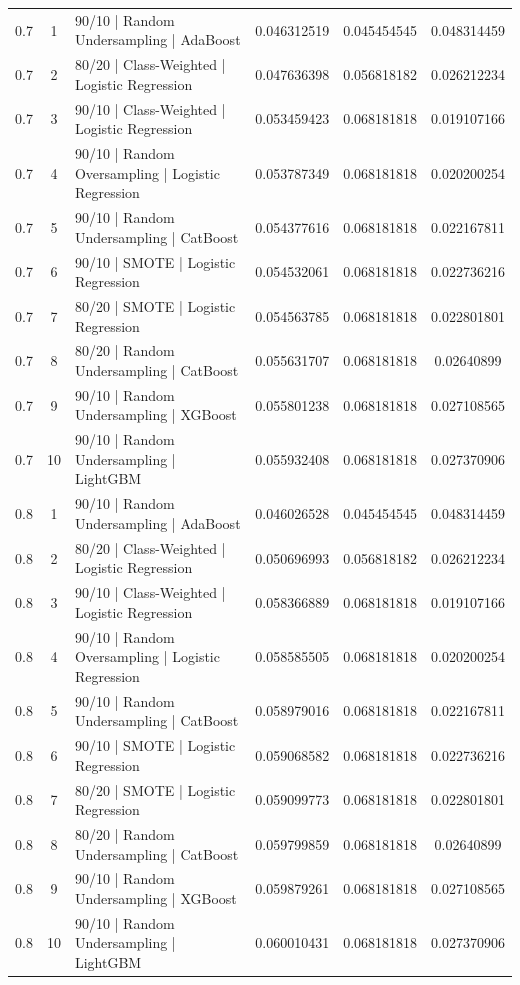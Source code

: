 \documentclass{article}
\begin{document}
\begin{longtable}{c c p{4cm} c c c}
0.7 & 1 & 90/10 | Random Undersampling | AdaBoost & 0.046312519 & 0.045454545 & 0.048314459 \\
0.7 & 2 & 80/20 | Class-Weighted | Logistic Regression & 0.047636398 & 0.056818182 & 0.026212234 \\
0.7 & 3 & 90/10 | Class-Weighted | Logistic Regression & 0.053459423 & 0.068181818 & 0.019107166 \\
0.7 & 4 & 90/10 | Random Oversampling | Logistic Regression & 0.053787349 & 0.068181818 & 0.020200254 \\
0.7 & 5 & 90/10 | Random Undersampling | CatBoost & 0.054377616 & 0.068181818 & 0.022167811 \\
0.7 & 6 & 90/10 | SMOTE | Logistic Regression & 0.054532061 & 0.068181818 & 0.022736216 \\
0.7 & 7 & 80/20 | SMOTE | Logistic Regression & 0.054563785 & 0.068181818 & 0.022801801 \\
0.7 & 8 & 80/20 | Random Undersampling | CatBoost & 0.055631707 & 0.068181818 & 0.02640899 \\
0.7 & 9 & 90/10 | Random Undersampling | XGBoost & 0.055801238 & 0.068181818 & 0.027108565 \\
0.7 & 10 & 90/10 | Random Undersampling | LightGBM & 0.055932408 & 0.068181818 & 0.027370906 \\
0.8 & 1 & 90/10 | Random Undersampling | AdaBoost & 0.046026528 & 0.045454545 & 0.048314459 \\
0.8 & 2 & 80/20 | Class-Weighted | Logistic Regression & 0.050696993 & 0.056818182 & 0.026212234 \\
0.8 & 3 & 90/10 | Class-Weighted | Logistic Regression & 0.058366889 & 0.068181818 & 0.019107166 \\
0.8 & 4 & 90/10 | Random Oversampling | Logistic Regression & 0.058585505 & 0.068181818 & 0.020200254 \\
0.8 & 5 & 90/10 | Random Undersampling | CatBoost & 0.058979016 & 0.068181818 & 0.022167811 \\
0.8 & 6 & 90/10 | SMOTE | Logistic Regression & 0.059068582 & 0.068181818 & 0.022736216 \\
0.8 & 7 & 80/20 | SMOTE | Logistic Regression & 0.059099773 & 0.068181818 & 0.022801801 \\
0.8 & 8 & 80/20 | Random Undersampling | CatBoost & 0.059799859 & 0.068181818 & 0.02640899 \\
0.8 & 9 & 90/10 | Random Undersampling | XGBoost & 0.059879261 & 0.068181818 & 0.027108565 \\
0.8 & 10 & 90/10 | Random Undersampling | LightGBM & 0.060010431 & 0.068181818 & 0.027370906 \\

\end{longtable}
\end{document}
